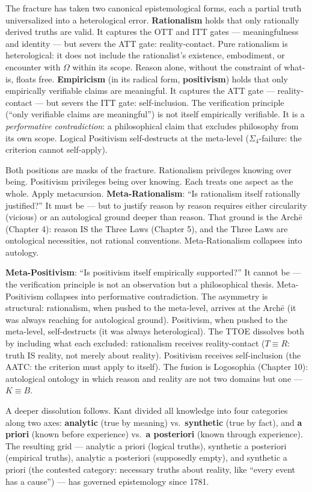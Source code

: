 \documentclass[10pt, openany, oneside]{book}
\begin{document}
The fracture has taken two canonical epistemological forms, each a partial truth universalized into a heterological error. \textbf{Rationalism} holds that only rationally derived truths are valid. It captures the OTT and ITT gates --- meaningfulness and identity --- but severs the ATT gate: reality-contact. Pure rationalism is heterological: it does not include the rationalist's existence, embodiment, or encounter with $\Omega$ within its scope. Reason alone, without the constraint of what-is, floats free. \textbf{Empiricism} (in its radical form, \textbf{positivism}) holds that only empirically verifiable claims are meaningful. It captures the ATT gate --- reality-contact --- but severs the ITT gate: self-inclusion. The verification principle (``only verifiable claims are meaningful'') is not itself empirically verifiable. It is a \textit{performative contradiction}: a philosophical claim that excludes philosophy from its own scope. Logical Positivism self-destructs at the meta-level ($\Sigma_4$-failure: the criterion cannot self-apply).

Both positions are masks of the fracture. Rationalism privileges knowing over being. Positivism privileges being over knowing. Each treats one aspect as the whole. Apply metacursion. \textbf{Meta-Rationalism}: ``Is rationalism itself rationally justified?'' It must be --- but to justify reason by reason requires either circularity (vicious) or an autological ground deeper than reason. That ground is the Arch\={e} (Chapter 4): reason IS the Three Laws (Chapter 5), and the Three Laws are ontological necessities, not rational conventions. Meta-Rationalism collapses into autology.

\textbf{Meta-Positivism}: ``Is positivism itself empirically supported?'' It cannot be --- the verification principle is not an observation but a philosophical thesis. Meta-Positivism collapses into performative contradiction. The asymmetry is structural: rationalism, when pushed to the meta-level, arrives at the Arch\={e} (it was always reaching for autological ground). Positivism, when pushed to the meta-level, self-destructs (it was always heterological). The TTOE dissolves both by including what each excluded: rationalism receives reality-contact ($T \equiv R$: truth IS reality, not merely about reality). Positivism receives self-inclusion (the AATC: the criterion must apply to itself). The fusion is Logosophia (Chapter 10): autological ontology in which reason and reality are not two domains but one --- $K \equiv B$.

A deeper dissolution follows. Kant divided all knowledge into four categories along two axes: \textbf{analytic} (true by meaning) vs.\ \textbf{synthetic} (true by fact), and \textbf{a priori} (known before experience) vs.\ \textbf{a posteriori} (known through experience). The resulting grid --- analytic a priori (logical truths), synthetic a posteriori (empirical truths), analytic a posteriori (supposedly empty), and synthetic a priori (the contested category: necessary truths about reality, like ``every event has a cause'') --- has governed epistemology since 1781.
\end{document}
